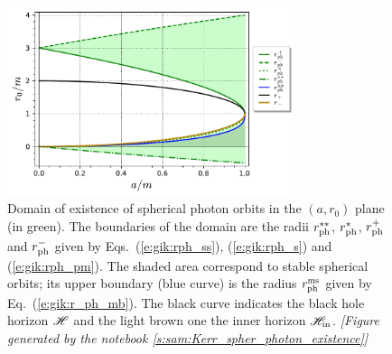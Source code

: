 \begin{figure}
\centerline{\includegraphics[width=0.75\textwidth]{gik_spher_orb_range.pdf}}
\caption[]{\label{f:gik:spher_orb_range} \footnotesize
Domain of existence of spherical photon orbits in the $(a, r_0)$ plane
(in green). The boundaries of the domain are the radii
$r_{\rm ph}^{**}$, $r_{\rm ph}^*$, $r_{\rm ph}^+$ and $r_{\rm ph}^-$
given by Eqs.~(\ref{e:gik:rph_ss}), (\ref{e:gik:rph_s}) and (\ref{e:gik:rph_pm}).
The shaded area correspond to stable spherical orbits; its upper boundary
(blue curve)
is the radius $r_{\rm ph}^{\rm ms}$ given by Eq.~(\ref{e:gik:r_ph_mb}).
The black curve indicates the black hole horizon $\mathscr{H}$ and the light brown one
the inner horizon $\mathscr{H}_{\rm in}$.
\textsl{[Figure generated by the notebook \ref{s:sam:Kerr_spher_photon_existence}]}
}
\end{figure}

